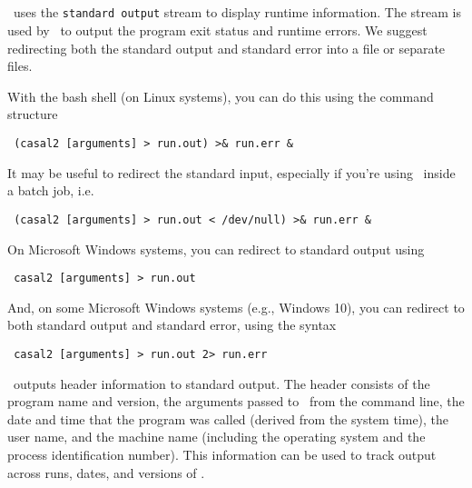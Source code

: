 \subsection{\label{sec:RedirectingStandardOut}}

\CNAME\ uses the \texttt{standard output} stream to display runtime information. The  stream is used by \CNAME\ to output the program exit status and runtime errors. We suggest redirecting both the standard output and standard error into a file or separate files.

With the bash shell (on Linux systems), you can do this using the command structure

\begin{verbatim} (casal2 [arguments] > run.out) >& run.err &\end{verbatim}

It may be useful to redirect the standard input, especially if you're using \CNAME\ inside a batch job, i.e.

\begin{verbatim} (casal2 [arguments] > run.out < /dev/null) >& run.err &\end{verbatim}

On Microsoft Windows systems, you can redirect to standard output using

\begin{verbatim} casal2 [arguments] > run.out\end{verbatim}

And, on some Microsoft Windows systems (e.g., Windows 10), you can redirect to both standard output and standard error, using the syntax

\begin{verbatim} casal2 [arguments] > run.out 2> run.err\end{verbatim}

\CNAME\ outputs header information to standard output. The header consists of the program name and version, the arguments passed to \CNAME\ from the command line, the date and time that the program was called (derived from the system time), the user name, and the machine name (including the operating system and the process identification number). This information can be used to track output across runs, dates, and versions of \CNAME .

\vspace*{4mm}

